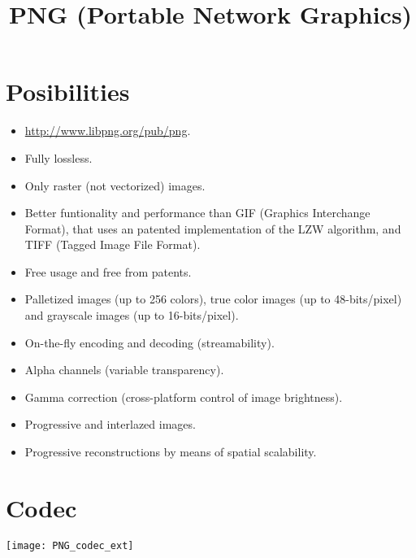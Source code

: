 \title{PNG (Portable Network Graphics)}

\maketitle
\tableofcontents

\section{Posibilities}
\begin{itemize}
\item \url{http://www.libpng.org/pub/png}.
\item Fully lossless.
\item Only raster (not vectorized) images.
\item Better funtionality and performance than GIF (Graphics
  Interchange Format), that uses an patented implementation of the LZW
  algorithm, and TIFF (Tagged Image File Format).
\item Free usage and free from patents.
\item Palletized images (up to 256 colors), true color images (up to
  48-bits/pixel) and grayscale images (up to 16-bits/pixel).
\item On-the-fly encoding and decoding (streamability).
\item Alpha channels (variable transparency).
\item Gamma correction (cross-platform control of image brightness).
\item Progressive and interlazed images.
\item Progressive reconstructions by means of spatial scalability.
\end{itemize} 

\section{Codec}
\begin{center}
\texttt{[image: PNG\_codec\_ext]}
\end{center}

